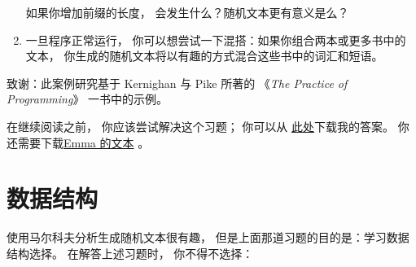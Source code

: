 \begin{exercise}
\begin{enumerate}
如果你增加前缀的长度， 会发生什么？随机文本更有意义是么？


\item 一旦程序正常运行， 你可以想尝试一下混搭：如果你组合两本或更多书中的文本，
   你生成的随机文本将以有趣的方式混合这些书中的词汇和短语。


\end{enumerate}


致谢：此案例研究基于 Kernighan 与 Pike 所著的 《{\em The Practice of
Programming}》 一书中的示例。

\end{exercise}


在继续阅读之前， 你应该尝试解决这个习题；
你可以从 \href{http://thinkpython2.com/code/markov.py}{此处}下载我的答案。
你还需要下载\href{http://thinkpython2.com/code/emma.txt}{Emma 的文本} 。

\section{数据结构}


使用马尔科夫分析生成随机文本很有趣，
但是上面那道习题的目的是：学习数据结构选择。
在解答上述习题时， 你不得不选择：


